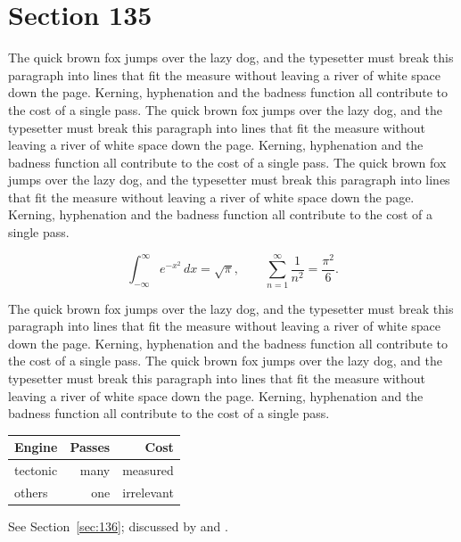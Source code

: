 \documentclass{article}
\begin{document}
\section{Section 135}
\label{sec:135}
The quick brown fox jumps over the lazy dog, and the typesetter must break this paragraph into lines that fit the measure without leaving a river of white space down the page. Kerning, hyphenation and the badness function all contribute to the cost of a single pass. The quick brown fox jumps over the lazy dog, and the typesetter must break this paragraph into lines that fit the measure without leaving a river of white space down the page. Kerning, hyphenation and the badness function all contribute to the cost of a single pass. The quick brown fox jumps over the lazy dog, and the typesetter must break this paragraph into lines that fit the measure without leaving a river of white space down the page. Kerning, hyphenation and the badness function all contribute to the cost of a single pass. 

\begin{equation}\label{eq:135}
\int_{-\infty}^{\infty} e^{-x^{2}}\,dx = \sqrt{\pi}, \qquad
\sum_{n=1}^{\infty} \frac{1}{n^{2}} = \frac{\pi^{2}}{6}.
\end{equation}

The quick brown fox jumps over the lazy dog, and the typesetter must break this paragraph into lines that fit the measure without leaving a river of white space down the page. Kerning, hyphenation and the badness function all contribute to the cost of a single pass. The quick brown fox jumps over the lazy dog, and the typesetter must break this paragraph into lines that fit the measure without leaving a river of white space down the page. Kerning, hyphenation and the badness function all contribute to the cost of a single pass. 

\begin{center}
\begin{tabular}{lrr}
\toprule
Engine & Passes & Cost \\
\midrule
tectonic & many & measured \\
others & one & irrelevant \\
\bottomrule
\end{tabular}
\end{center}

See Section~\ref{sec:136}; discussed by \textcite{k1} and \textcite{l3}.
\end{document}
